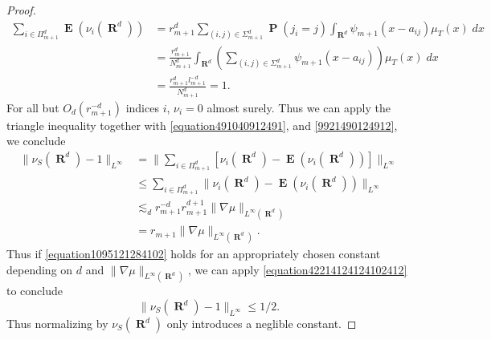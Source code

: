 \documentclass[12pt,reqno]{amsart}
\DeclareMathOperator{\RR}{\mathbf{R}}
\DeclareMathOperator{\EE}{\mathbf{E}}
\DeclareMathOperator{\PP}{\mathbf{P}}
\begin{document}
\begin{proof}
\begin{equation}
\begin{split}
		\sum_{i \in \Pi_{m+1}^d} \EE(\nu_i(\RR^d)) &= r_{m+1}^d \sum\nolimits_{(i,j) \in \Sigma_{m+1}^d} \PP(j_i = j) \int_{\RR^d} \psi_{m+1}(x - a_{ij}) \mu_T(x)\; dx\\
		&= \frac{r_{m+1}^d}{N_{m+1}^d} \int_{\RR^d} \left( \sum\nolimits_{(i,j) \in \Sigma_{m+1}^d} \psi_{m+1}(x - a_{ij}) \right) \mu_T(x)\; dx\\
		&= \frac{r_{m+1}^d l_{m+1}^{-d}}{N_{m+1}^d} = 1.
	\end{split}
	\end{equation}
	For all but $O_d(r_{m+1}^{-d})$ indices $i$, $\nu_i = 0$ almost surely. Thus we can apply the triangle inequality together with \eqref{equation491040912491}, and \eqref{9921490124912}, we conclude
	\begin{equation} \label{equation42214124124102412}
	\begin{split}
		\| \nu_S(\RR^d) - 1 \|_{L^\infty} &= \| \sum\nolimits_{i \in \Pi_{m+1}^d} \left[ \nu_i(\RR^d) - \EE(\nu_i(\RR^d)) \right] \|_{L^\infty} \\
		&\leq \sum\nolimits_{i \in \Pi_{m+1}^d} \| \nu_i(\RR^d) - \EE(\nu_i(\RR^d)) \|_{L^\infty}\\
		&\lesssim_d r_{m+1}^{-d} r_{m+1}^{d+1} \| \nabla \mu \|_{L^\infty(\RR^d)}\\
		&= r_{m+1} \| \nabla \mu \|_{L^\infty(\RR^d)}.
	\end{split}
	\end{equation}	
    Thus if \eqref{equation1095121284102} holds for an appropriately chosen constant depending on $d$ and $\| \nabla \mu \|_{L^\infty(\RR^d)}$, we can apply \eqref{equation42214124124102412} to conclude
    \begin{equation} \label{equation86912904129041290}
        \| \nu_S(\RR^d) - 1 \|_{L^\infty} \leq 1/2.
    \end{equation}
	Thus normalizing by $\nu_S(\RR^d)$ only introduces a neglible constant.


\end{proof}
\end{document}
